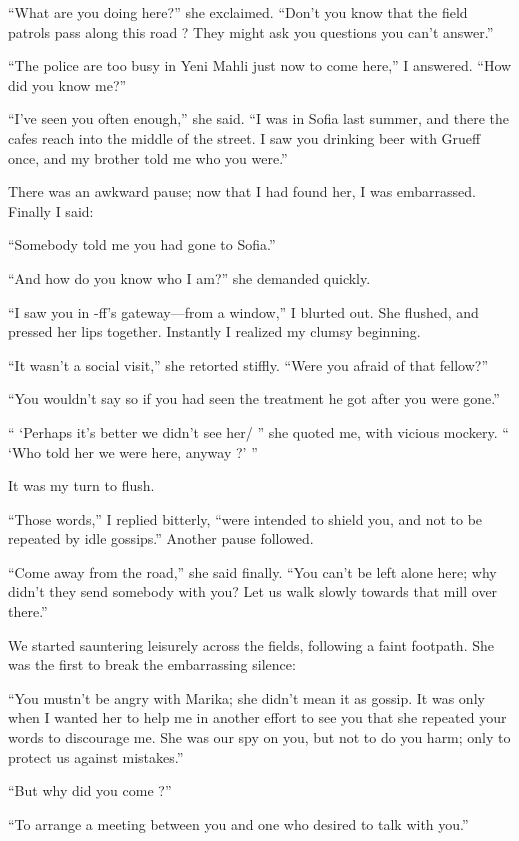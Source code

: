 \documentclass[a5paper,12pt]{book}
\begin{document}
“What are you doing here?” she exclaimed. “Don't you know that the field patrols pass along this road ? They might ask you questions you can't answer.” 

“The police are too busy in Yeni Mahli just now to come here,” I answered. “How did you know me?” 

“I've seen you often enough,” she said. “I was in Sofia last summer, and there the cafes reach into the middle of the street. I saw you drinking beer with Grueff once, and my brother told me who you were.” 

There was an awkward pause; now that I had found her, I was embarrassed. Finally I said: 

“Somebody told me you had gone to Sofia.” 

“And how do you know who I am?” she demanded quickly. 

“I saw you in -ff’s gateway—from a window,” I blurted out. She flushed, and pressed her lips together. Instantly I realized my clumsy beginning. 

“It wasn’t a social visit,” she retorted stiffly. “Were you afraid of that fellow?” 

“You wouldn’t say so if you had seen the treatment he got after you were gone.” 

“ ‘Perhaps it’s better we didn’t see her/ ” she quoted me, with vicious mockery. “ ‘Who told her we were here, anyway ?’ ” 

It was my turn to flush. 

“Those words,” I replied bitterly, “were intended to shield you, and not to be repeated by idle gossips.” Another pause followed. 

“Come away from the road,” she said finally. “You can’t be left alone here; why didn’t they send somebody with you? Let us walk slowly towards that mill over there.” 

We started sauntering leisurely across the fields, following a faint footpath. She was the first to break the embarrassing silence: 

“You mustn’t be angry with Marika; she didn’t mean it as gossip. It was only when I wanted her to help me in another effort to see you that she repeated your words to discourage me. She was our spy on you, but not to do you harm; only to protect us against mistakes.” 

“But why did you come ?” 

“To arrange a meeting between you and one who desired to talk with you.” 
\end{document}
